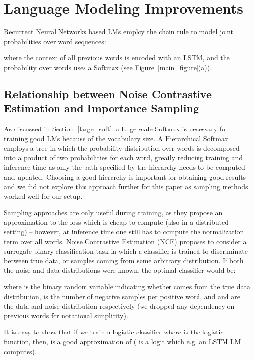 \documentclass{article}
\begin{document}
 \section{Language Modeling Improvements}
\label{model}

Recurrent Neural Networks based LMs employ the chain rule to model joint probabilities over word sequences:


where the context of all previous words is encoded with an LSTM, and the probability over words uses a Softmax (see Figure~\ref{main_figure}(a)).


\subsection{Relationship between Noise Contrastive Estimation and Importance Sampling}
\label{is_soft}

As discussed in Section~\ref{large_soft}, a large scale Softmax is necessary for training good LMs because of the vocabulary size. A Hierarchical Softmax \cite{mnih2009scalable} employs a tree in which the probability distribution over words is decomposed into a product of two probabilities for each word, greatly reducing training and inference time as only the path specified by the hierarchy needs to be computed and updated. Choosing a good hierarchy is important for obtaining good results and we did not explore this approach further for this paper as sampling methods worked well for our setup.

Sampling approaches are only useful during training, as they propose an approximation to the loss which is cheap to compute (also in a distributed setting) -- however, at inference time one still has to compute the normalization term over all words. Noise Contrastive Estimation (NCE) proposes to consider a surrogate binary classification task in which a classifier is trained to discriminate between true data, or samples coming from some arbitrary distribution. If both the noise and data distributions were known, the optimal classifier would be:


where  is the binary random variable indicating whether  comes from the true data distribution,  is the number of negative samples per positive word, and  and  are the data and noise distribution respectively (we dropped any dependency on previous words for notational simplicity).

It is easy to show that if we train a logistic classifier  where  is the logistic function, then,  is a good approximation of  ( is a logit which e.g. an LSTM LM computes).
\end{document}
